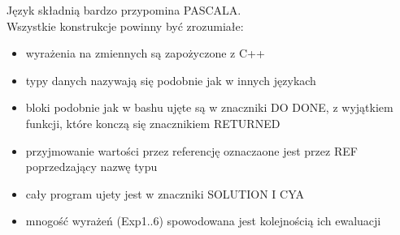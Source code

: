 \documentclass[a4paper,11pt]{article}
\begin{document}
Język składnią bardzo przypomina PASCALA.\\
Wszystkie konstrukcje powinny być zrozumiałe:
\begin{itemize}
  \item wyrażenia na zmiennych są zapożyczone z C++
  \item typy danych nazywają się podobnie jak w innych językach
  \item bloki podobnie jak w bashu ujęte są w znaczniki DO DONE, z wyjątkiem funkcji, które konczą się znacznikiem RETURNED\\
  \item przyjmowanie wartości przez referencję oznaczaone jest przez REF poprzedzający nazwę typu
  \item cały program ujety jest w znaczniki SOLUTION I CYA
  \item mnogość wyrażeń (Exp1..6) spowodowana jest kolejnością ich ewaluacji
\end{itemize}
\end{document}
